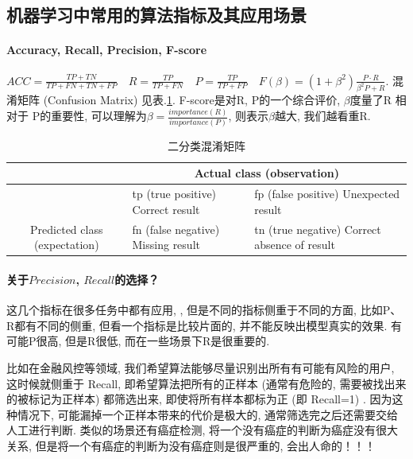 \subsection{机器学习中常用的算法指标及其应用场景}

\paragraph{Accuracy, Recall, Precision, F-score}

$ACC = \frac{TP + TN}{TP+FN+TN+FP}\quad R = \frac{TP}{TP+FN}\quad P = \frac{TP}{TP+FP}\quad F(\beta) = (1 + \beta^2)\frac{P \cdot R}{\beta^2 P + R}$. 混淆矩阵 (Confusion Matrix) 见表.\ref{tab:confusion_mat}. F-score是对R, P的一个综合评价, $\beta$度量了R 相对于 P的重要性, 可以理解为$\beta = \frac{importance(R) }{importance(P)}$, 则表示$\beta$越大, 我们越看重R. 

\begin{table}[h]
	\centering
	\caption{二分类混淆矩阵}
	\label{tab:confusion_mat}
	\begin{tabular}{|c|l|l|}
		\hline
		\multicolumn{1}{|l|}{}                          & \multicolumn{2}{c|}{Actual class (observation)}                                                                                   \\ \hline
		& tp (true positive) Correct result                          & fp (false positive) Unexpected result                                \\ \cline{2-3} 
		\multirow{-2}{*}{Predicted class (expectation)} & \cellcolor[HTML]{68CBD0}fn (false negative) Missing result & \cellcolor[HTML]{68CBD0}tn (true negative) Correct absence of result \\ \hline
	\end{tabular}
\end{table}

\paragraph*{关于$Precision$, $Recall$的选择？}这几个指标在很多任务中都有应用, , 但是不同的指标侧重于不同的方面, 比如P、R都有不同的侧重, 但看一个指标是比较片面的, 并不能反映出模型真实的效果. 有可能P很高, 但是R很低, 而在一些场景下R是很重要的. 

比如在金融风控等领域, 我们希望算法能够尽量识别出所有有可能有风险的用户, 这时候就侧重于 Recall, 即希望算法把所有的正样本 (通常有危险的, 需要被找出来的被标记为正样本) 都筛选出来, 即使将所有样本都标为正 (即 Recall=1) . 因为这种情况下, 可能漏掉一个正样本带来的代价是极大的, 通常筛选完之后还需要交给人工进行判断. 类似的场景还有癌症检测, 将一个没有癌症的判断为癌症没有很大关系, 但是将一个有癌症的判断为没有癌症则是很严重的, 会出人命的！！！

